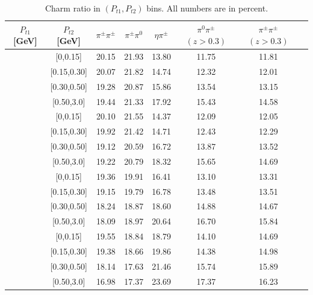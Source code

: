 \begin{table}[H]\footnotesize
\centering
\begin{tabular}{|c|c||c|c|c|c|c|c|}
\hline
$P_{t1}$ [GeV] & $P_{t2}$ [GeV] &$\pi^{\pm}\pi^{\pm}$ & $\pi^{\pm}\pi^0$ & $\eta\pi^{\pm}$ & $\pi^0\pi^{\pm}$ $(z>0.3)$ & $\pi^{\pm}\pi^{\pm}$ $(z>0.3)$ \\ \hline\hline
[0,0.15]	&	[0,0.15]	&	20.15	&	21.93	&	13.80	&	11.75	&	11.81	\\ \hline
[0,0.15]	&	[0.15,0.30]	&	20.07	&	21.82	&	14.74	&	12.32	&	12.01	\\ \hline
[0,0.15]	&	[0.30,0.50]	&	19.28	&	20.87	&	15.86	&	13.54	&	13.15	\\ \hline
[0,0.15]	&	[0.50,3.0]	&	19.44	&	21.33	&	17.92	&	15.43	&	14.58	\\ \hline\hline
[0.15,0.30]	&	[0,0.15]	&	20.10	&	21.55	&	14.37	&	12.09	&	12.05	\\ \hline
[0.15,0.30]	&	[0.15,0.30]	&	19.92	&	21.42	&	14.71	&	12.43	&	12.29	\\ \hline
[0.15,0.30]	&	[0.30,0.50]	&	19.12	&	20.59	&	16.72	&	13.87	&	13.52	\\ \hline
[0.15,0.30]	&	[0.50,3.0]	&	19.22	&	20.79	&	18.32	&	15.65	&	14.69	\\ \hline\hline
[0.30,0.50]	&	[0,0.15]	&	19.36	&	19.91	&	16.41	&	13.10	&	13.31	\\ \hline
[0.30,0.50]	&	[0.15,0.30]	&	19.15	&	19.79	&	16.78	&	13.48	&	13.51	\\ \hline
[0.30,0.50]	&	[0.30,0.50]	&	18.24	&	18.87	&	18.60	&	14.88	&	14.67	\\ \hline
[0.30,0.50]	&	[0.50,3.0]	&	18.09	&	18.97	&	20.64	&	16.70	&	15.84	\\ \hline\hline
[0.50,3.0]	&	[0,0.15]	&	19.55	&	18.84	&	18.79	&	14.10	&	14.69	\\ \hline
[0.50,3.0]	&	[0.15,0.30]	&	19.38	&	18.66	&	19.86	&	14.38	&	14.98	\\ \hline
[0.50,3.0]	&	[0.30,0.50]	&	18.14	&	17.63	&	21.46	&	15.74	&	15.89	\\ \hline
[0.50,3.0]	&	[0.50,3.0]	&	16.98	&	17.37	&	23.69	&	17.37	&	16.23	\\ \hline
\end{tabular}
\caption[Charm ratio in combined $(P_{t1},P_{t2})$ bins]{Charm ratio in $(P_{t1},P_{t2})$ bins. All numbers are in percent.}
\label{tab:comptcharmratio}
\end{table}
\iffalse
